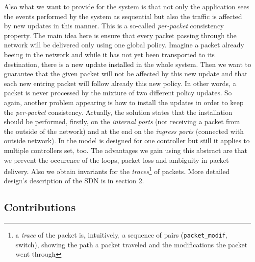 \documentclass{article}
\begin{document}
Also what we want to provide for the system is that not only the application sees the events performed by the system as sequential but also the traffic is affected by new updates in this manner. This is a so-called \emph{per-packet} consistency property\cite{Reitblatt:2012:ANU:2342356.2342427}. The main idea here is ensure that every packet passing through the network will be delivered only using one global policy. Imagine a packet already beeing in the network and while it has not yet been transported to its destination, there is a new update installed in the whole system. Then we want to guarantee that the given packet will not be affected by this new update and that each new entring packet will follow already this new policy. In other words, a packet is never processed by the mixture of two different policy updates.  
So again, another problem appearing is how to install the updates in order to keep the \emph{per-packet} consistency. Actually, the solution states that the installation should be performed, firstly, on the \emph{internal ports} (not receiving a packet from the outside of the network) and at the end on the \emph{ingress ports} (connected with outside network). In \cite{Reitblatt:2012:ANU:2342356.2342427} the model is designed for one controller but still it applies to multiple controllers set, too.
The advantages we gain using this abstract are that  we prevent the occurence of the loops, packet loss and ambiguity in packet delivery. 
Also we obtain invariants for the \emph{traces}\footnote{a \emph{trace} of the packet is, intuitively, a sequence of pairs (\texttt{packet\_modif}, switch), showing the path a packet traveled and the modifications the packet went through} of packets.
More detailed design's description of the SDN is in section 2. 

  
\subsection{Contributions}
\end{document}
